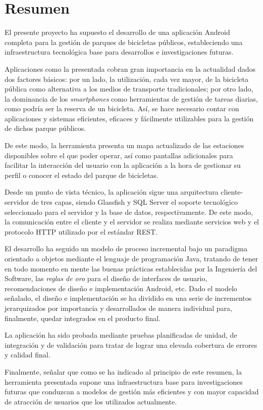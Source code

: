 
\chapter{Resumen}


El presente proyecto ha supuesto el desarrollo de una aplicación Android completa para la gestión de parques de bicicletas públicos, estableciendo una infraestructura tecnológica base para desarrollos e investigaciones futuras. 

Aplicaciones como la presentada cobran gran importancia en la actualidad dados dos factores básicos: por un lado, la utilización, cada vez mayor, de la bicicleta pública como alternativa a los medios de transporte tradicionales; por otro lado, la dominancia de los \emph{smartphones} como herramientas de gestión de tareas diarias, como podría ser la reserva de un bicicleta. Así, se hace necesario contar con aplicaciones y sistemas eficientes, eficaces y fácilmente utilizables para la gestión de dichos parque públicos.

De este modo, la herramienta presenta un mapa actualizado de las estaciones disponibles sobre el que poder operar, así como pantallas adicionales para facilitar la interacción del usuario con la aplicación a la hora de gestionar su perfil o conocer el estado del parque de bicicletas.

Desde un punto de vista técnico, la aplicación sigue una arquitectura cliente-servidor de tres capas, siendo Glassfish y SQL Server el soporte tecnológico seleccionado para el servidor y la base de datos, respectivamente. De este modo, la comunicación entre el cliente y el servidor se realiza mediante servicios web y el protocolo HTTP utilizado por el estándar REST. 

El desarrollo ha seguido un modelo de proceso incremental bajo un paradigma orientado a objetos mediante el lenguaje de programación Java, tratando de tener en todo momento en mente las buenas prácticas establecidas por la Ingeniería del Software, las \emph{reglas de oro} para el diseño de interfaces de usuario, recomendaciones de diseño e implementación Android, etc. Dado el modelo señalado, el diseño e implementación se ha dividido en una serie de incrementos jerarquizados por importancia y desarrollados de manera individual para, finalmente, quedar integrados en el producto final.

La aplicación ha sido probada mediante pruebas planificadas de unidad, de integración y de validación para tratar de lograr una elevada cobertura de errores y calidad final.

Finalmente, señalar que como se ha indicado al principio de este resumen, la herramienta presentada supone una infraestructura base para investigaciones futuras que conduzcan a modelos de gestión más eficientes y con mayor capacidad de atracción de usuarios que los utilizados actualmente.




